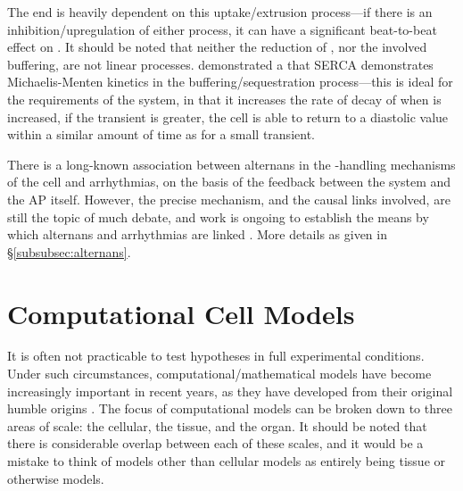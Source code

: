 \documentclass[../thesis-main.tex]{subfiles}
\begin{document}
The end \cadia{} is heavily dependent on this uptake/extrusion process---if there is an inhibition/up\-regulation of either process, it can have a significant beat-to-beat effect on \cadia{}. It should be noted that neither the reduction of \cai{}, nor the involved buffering, are not linear processes. \citet{Bers1995} demonstrated a that SERCA demonstrates Michaelis-Menten kinetics in the buffering/sequestration process---this is ideal for the requirements of the system, in that it increases the rate of decay of \cai{} when \cai{} is increased, \idest{} if the \ca{} transient is greater, the cell is able to return \cai{} to a diastolic value within a similar amount of time as for a small transient.

There is a long-known association between alternans in the \ca{}-handling mechanisms of the cell and arrhythmias, on the basis of the feedback between the \ca{} system and the AP itself. However, the precise mechanism, and the causal links involved, are still the topic of much debate, and work is ongoing to establish the means by which alternans and arrhythmias are linked \citep{Alvarez-Lacalle2013, Chen2009, Restrepo2008}. More details as given in \S\ref{subsubsec:alternans}.




\section{Computational Cell Models}
\label{sec:cell-models}
It is often not practicable to test hypotheses in full experimental conditions. Under such circumstances, computational/mathematical models have become increasingly important in recent years, as they have developed from their original humble origins \citep{Jalife2013}. The focus of computational models can be broken down to three areas of scale: the cellular, the tissue, and the organ. It should be noted that there is considerable overlap between each of these scales, and it would be a mistake to think of models other than cellular models as entirely being tissue or otherwise models.
\end{document}
